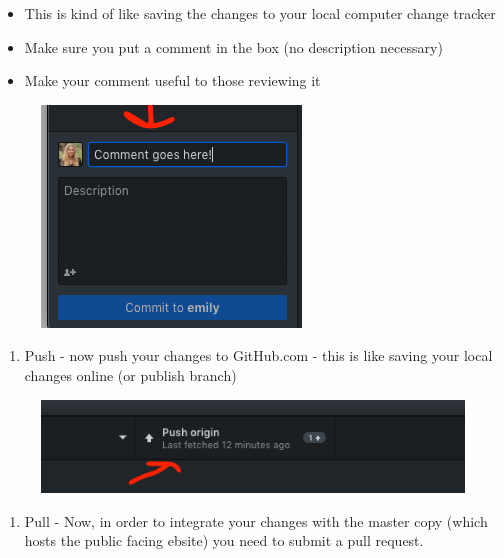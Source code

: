 \documentclass[]{book}
\providecommand{\tightlist}{%
  \setlength{\itemsep}{0pt}\setlength{\parskip}{0pt}}
\begin{document}
\begin{itemize}
\tightlist
\item
  This is kind of like saving the changes to your local computer change
  tracker
\item
  Make sure you put a comment in the box (no description necessary)
\item
  Make your comment useful to those reviewing it
\end{itemize}

\begin{figure}
\centering
\includegraphics{images/research_protocols/github/25.png}
\caption{}
\end{figure}

\begin{enumerate}
\def\labelenumi{\arabic{enumi}.}
\setcounter{enumi}{5}
\tightlist
\item
  Push - now push your changes to GitHub.com - this is like saving your
  local changes online (or publish branch)
\end{enumerate}

\begin{figure}
\centering
\includegraphics{images/research_protocols/github/26.png}
\caption{}
\end{figure}

\begin{enumerate}
\def\labelenumi{\arabic{enumi}.}
\setcounter{enumi}{6}
\tightlist
\item
  Pull - Now, in order to integrate your changes with the master copy
  (which hosts the public facing ebsite) you need to submit a pull
  request.
\end{enumerate}
\end{document}
